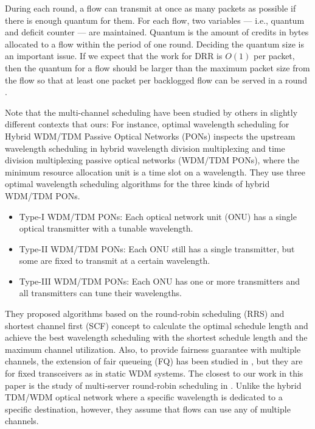 \documentclass[conference,letterpaper]{IEEEtran}
\begin{document}
During each round, a flow can transmit at once as many packets as possible if
there is enough quantum for them. For each flow, two variables --- i.e., quantum
and deficit counter --- are maintained. Quantum is the amount of credits in
bytes allocated to a flow within the period of one round. Deciding the quantum
size is an important issue. If we expect that the work for DRR is $O(1)$ per
packet, then the quantum for a flow should be larger than the maximum packet
size from the flow so that at least one packet per backlogged flow can be served
in a round \cite{Shreedhar:95-1}.


Note that the multi-channel scheduling have been studied by others in slightly
different contexts that ours: For instance, optimal wavelength scheduling for
Hybrid WDM/TDM Passive Optical Networks (PONs)
\cite{wang11:_optim_wavel_sched_hybrid_wdm} inspects the upstream wavelength
scheduling in hybrid wavelength division multiplexing and time division
multiplexing passive optical networks (WDM/TDM PONs), where the minimum resource
allocation unit is a time slot on a wavelength. They use three optimal
wavelength scheduling algorithms for the three kinds of hybrid WDM/TDM PONs.
\begin{itemize}
\item Type-I WDM/TDM PONs: Each optical network unit (ONU) has a single optical
  transmitter with a tunable wavelength.
\item Type-II WDM/TDM PONs: Each ONU still has a single transmitter, but some
  are fixed to transmit at a certain wavelength.
\item Type-III WDM/TDM PONs: Each ONU has one or more transmitters and all
  transmitters can tune their wavelengths.
\end{itemize}
They proposed algorithms based on the round-robin scheduling (RRS) and shortest
channel first (SCF) concept to calculate the optimal schedule length and achieve
the best wavelength scheduling with the shortest schedule length and the maximum
channel utilization.
Also, to provide fairness guarantee with multiple channels, the extension of
fair queueing (FQ) has been studied in \cite{Blanquer:01-1,Cobb:02-1}, but they
are for fixed transceivers as in static WDM systems. The closest to our work in
this paper is the study of multi-server round-robin scheduling in
\cite{xiao04:_analy_of_multi_server_round}. Unlike the hybrid TDM/WDM optical
network where a specific wavelength is dedicated to a specific destination,
however, they assume that flows can use any of multiple channels.
\end{document}

